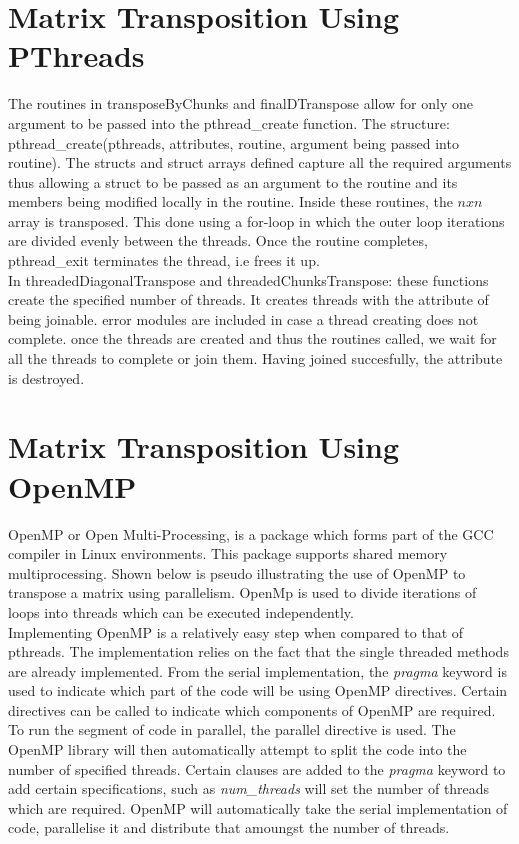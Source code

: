 \documentclass[a4paper, 11pt, onecolumn, conference]{IEEEtran}      %
\begin{document}
\section{Matrix Transposition Using PThreads}

The routines in transposeByChunks and finalDTranspose allow for only one argument to be passed into the pthread\_create function. The structure: pthread\_create(pthreads, attributes, routine, argument being passed into routine). The structs and struct arrays defined capture all the required arguments thus allowing a struct to be passed as an argument to the routine and its members being modified locally in the routine. Inside these routines, the $nxn$ array is transposed. This done using a for-loop in which the outer loop iterations are divided evenly between the threads. Once the routine completes, pthread\_exit terminates the thread, i.e frees it up.\\

In threadedDiagonalTranspose and threadedChunksTranspose: these functions create the specified number of threads. It creates threads with the attribute of being joinable. error modules are included in case a thread creating does not complete. once the threads are created and thus the routines called, we wait for all the threads to complete or join them. Having joined succesfully, the attribute is destroyed. 

\section{Matrix Transposition Using OpenMP}

OpenMP or Open Multi-Processing, is a package which forms part of the GCC compiler in Linux environments. This package supports shared memory multiprocessing\cite{utexas_getting_nodate}. Shown below is pseudo illustrating the use of OpenMP to transpose a matrix using parallelism. OpenMp is used to divide iterations of loops into threads which can be executed independently.\\

Implementing OpenMP is a relatively easy step when compared to that of pthreads. The implementation relies on the fact that the single threaded methods are already implemented. From the serial implementation, the \textit{pragma} keyword is used to indicate which part of the code will be using OpenMP directives\cite{utexas_getting_nodate}.  Certain directives can be called to indicate which components of OpenMP are required. To run the segment of code in parallel, the parallel directive is used. The OpenMP library will then automatically attempt to split the code into the number of specified threads\cite{utexas_getting_nodate}. Certain clauses are added to the \textit{pragma} keyword to add certain specifications, such as \textit{num\_threads} will set the number of threads which are required\cite{utexas_getting_nodate}. OpenMP will automatically take the serial implementation of code, parallelise it and distribute that amoungst the number of threads\cite{utexas_getting_nodate}.\\
\end{document}
